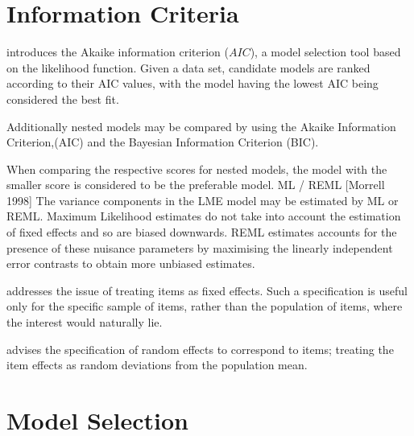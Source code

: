 \documentclass[12pt, a4paper]{report}
\theoremstyle{plain}
\theoremstyle{definition}
\theoremstyle{remark}
\begin{document}
\section{Information Criteria}

\citet{akaike} introduces the Akaike information criterion ($AIC$), a model selection tool based on the likelihood function. Given a data set, candidate models are ranked according to their AIC values, with the model having the lowest AIC being considered the best fit.


Additionally nested models may be compared by using the Akaike Information Criterion,(AIC) and the Bayesian Information Criterion (BIC).

When comparing the respective scores for nested models, the model with the smaller score is considered to be the preferable model.
ML / REML
[Morrell 1998]
The variance components in the LME model may be estimated by ML or REML.
Maximum Likelihood estimates do not take into account the estimation of fixed effects and so
are biased downwards.
REML estimates accounts for the presence of these nuisance parameters by maximising the linearly independent error contrasts to obtain more unbiased estimates.

\citet{PB} addresses the issue of treating items as fixed effects. Such a specification is useful only for the specific sample of items, rather than the population of items, where the interest would naturally lie.

\citet{PB} advises the specification of random effects to correspond to items; treating the item effects as random deviations from the population mean.



%
%

\section{Model Selection}
\end{document}
